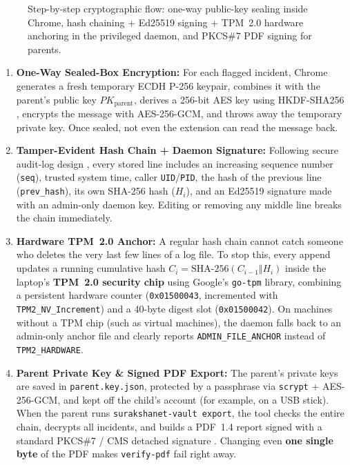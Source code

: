 \documentclass[11pt,a4paper]{article}
\begin{document}
\begin{figure}[H]
  \centering
  \resizebox{\textwidth}{!}{}
  \caption{Step-by-step cryptographic flow: one-way public-key sealing inside Chrome, hash chaining + Ed25519 signing + TPM~2.0 hardware anchoring in the privileged daemon, and PKCS\#7 PDF signing for parents.}
  \label{fig:sealedbox_chain}
\end{figure}

\begin{enumerate}
  \item \textbf{One-Way Sealed-Box Encryption:} For each flagged incident, Chrome generates a fresh temporary ECDH P-256 keypair, combines it with the parent's public key $PK_{\text{parent}}$, derives a 256-bit AES key using HKDF-SHA256 \cite{rfc5869}, encrypts the message with AES-256-GCM, and throws away the temporary private key. Once sealed, not even the extension can read the message back.
  \item \textbf{Tamper-Evident Hash Chain + Daemon Signature:} Following secure audit-log design \cite{schneier1999secure}, every stored line includes an increasing sequence number (\texttt{seq}), trusted system time, caller \texttt{UID}/\texttt{PID}, the hash of the previous line (\texttt{prev\_hash}), its own SHA-256 hash ($H_i$), and an Ed25519 signature made with an admin-only daemon key. Editing or removing any middle line breaks the chain immediately.
  \item \textbf{Hardware TPM~2.0 Anchor:} A regular hash chain cannot catch someone who deletes the very last few lines of a log file. To stop this, every append updates a running cumulative hash $C_i = \text{SHA-256}(C_{i-1} \Vert H_i)$ inside the laptop's \textbf{TPM~2.0 security chip} \cite{tcg2019tpm2} using Google's \texttt{go-tpm} library, combining a persistent hardware counter (\texttt{0x01500043}, incremented with \texttt{TPM2\_NV\_Increment}) and a 40-byte digest slot (\texttt{0x01500042}). On machines without a TPM chip (such as virtual machines), the daemon falls back to an admin-only anchor file and clearly reports \texttt{ADMIN\_FILE\_ANCHOR} instead of \texttt{TPM2\_HARDWARE}.
  \item \textbf{Parent Private Key \& Signed PDF Export:} The parent's private keys are saved in \texttt{parent.key.json}, protected by a passphrase via \texttt{scrypt} + AES-256-GCM, and kept off the child's account (for example, on a USB stick). When the parent runs \texttt{surakshanet-vault export}, the tool checks the entire chain, decrypts all incidents, and builds a PDF~1.4 report signed with a standard PKCS\#7 / CMS detached signature \cite{rfc5652}. Changing even \textbf{one single byte} of the PDF makes \texttt{verify-pdf} fail right away.
\end{enumerate}
\end{document}

